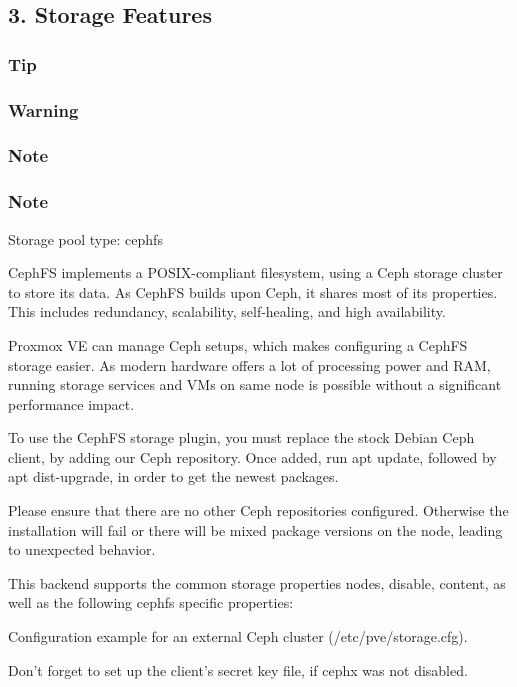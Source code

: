 \subsection{3. Storage Features}

\subsubsection{Tip}

\subsubsection{Warning}

\subsubsection{Note}

\subsubsection{Note}

Storage pool type: cephfs

CephFS implements a POSIX-compliant filesystem, using a Ceph storage cluster to store its data. As CephFS builds upon Ceph, it shares most of its properties. This includes redundancy, scalability, self-healing, and high availability.

Proxmox VE can manage Ceph setups, which makes configuring a CephFS storage easier. As modern hardware offers a lot of processing power and RAM, running storage services and VMs on same node is possible without a significant performance impact.

To use the CephFS storage plugin, you must replace the stock Debian Ceph client, by adding our Ceph repository. Once added, run apt update, followed by apt dist-upgrade, in order to get the newest packages.

Please ensure that there are no other Ceph repositories configured. Otherwise the installation will fail or there will be mixed package versions on the node, leading to unexpected behavior.

This backend supports the common storage properties nodes, disable, content, as well as the following cephfs specific properties:

Configuration example for an external Ceph cluster (/etc/pve/storage.cfg).

Don’t forget to set up the client’s secret key file, if cephx was not disabled.

